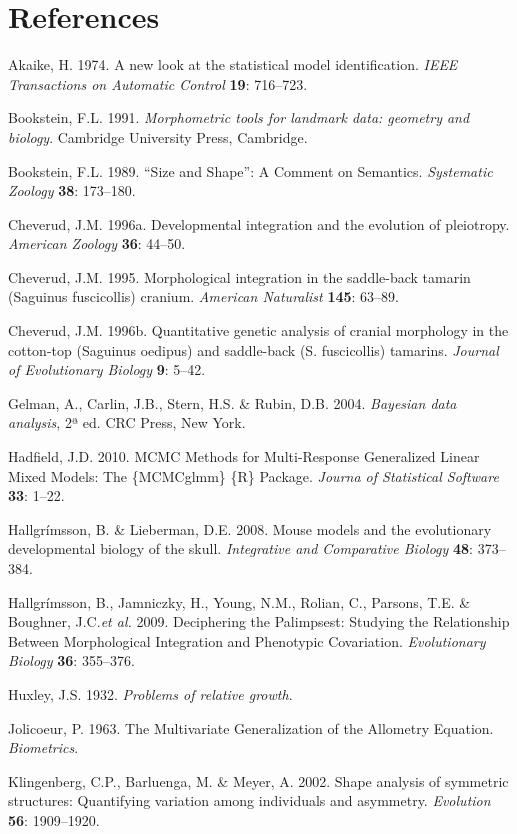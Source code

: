 \documentclass[12pt,]{article}
\begin{document}
\section*{References}\label{references}

Akaike, H. 1974. A new look at the statistical model identification.
\emph{IEEE Transactions on Automatic Control} \textbf{19}: 716--723.

Bookstein, F.L. 1991. \emph{Morphometric tools for landmark data:
geometry and biology}. Cambridge University Press, Cambridge.

Bookstein, F.L. 1989. ``Size and Shape'': A Comment on Semantics.
\emph{Systematic Zoology} \textbf{38}: 173--180.

Cheverud, J.M. 1996a. Developmental integration and the evolution of
pleiotropy. \emph{American Zoology} \textbf{36}: 44--50.

Cheverud, J.M. 1995. Morphological integration in the saddle-back
tamarin (Saguinus fuscicollis) cranium. \emph{American Naturalist}
\textbf{145}: 63--89.

Cheverud, J.M. 1996b. Quantitative genetic analysis of cranial
morphology in the cotton-top (Saguinus oedipus) and saddle-back (S.
fuscicollis) tamarins. \emph{Journal of Evolutionary Biology}
\textbf{9}: 5--42.

Gelman, A., Carlin, J.B., Stern, H.S. \& Rubin, D.B. 2004.
\emph{Bayesian data analysis}, 2ª ed. CRC Press, New York.

Hadfield, J.D. 2010. MCMC Methods for Multi-Response Generalized Linear
Mixed Models: The \{MCMCglmm\} \{R\} Package. \emph{Journa of
Statistical Software} \textbf{33}: 1--22.

Hallgrímsson, B. \& Lieberman, D.E. 2008. Mouse models and the
evolutionary developmental biology of the skull. \emph{Integrative and
Comparative Biology} \textbf{48}: 373--384.

Hallgrímsson, B., Jamniczky, H., Young, N.M., Rolian, C., Parsons, T.E.
\& Boughner, J.C.\emph{et al.} 2009. Deciphering the Palimpsest:
Studying the Relationship Between Morphological Integration and
Phenotypic Covariation. \emph{Evolutionary Biology} \textbf{36}:
355--376.

Huxley, J.S. 1932. \emph{Problems of relative growth}.

Jolicoeur, P. 1963. The Multivariate Generalization of the Allometry
Equation. \emph{Biometrics}.

Klingenberg, C.P., Barluenga, M. \& Meyer, A. 2002. Shape analysis of
symmetric structures: Quantifying variation among individuals and
asymmetry. \emph{Evolution} \textbf{56}: 1909--1920.
\end{document}
